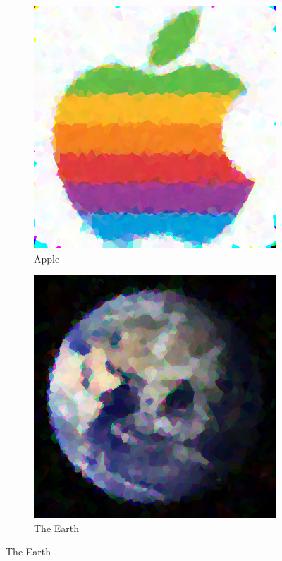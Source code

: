 \documentclass{article}
\begin{document}
\begin{figure}[ht]
   	 \centering
     \begin{subfigure}[b]{0.45\textwidth}
         \centering
         \includegraphics[width=\textwidth]{latex_src/voronoi27.png}
         \caption{Apple}
     \end{subfigure}
     \hfill
     \begin{subfigure}[b]{0.45\textwidth}
         \centering
         \includegraphics[width=\textwidth]{latex_src/voronoi26.png}
         \caption{The Earth}
     \end{subfigure}
\end{figure}
\end{document}
